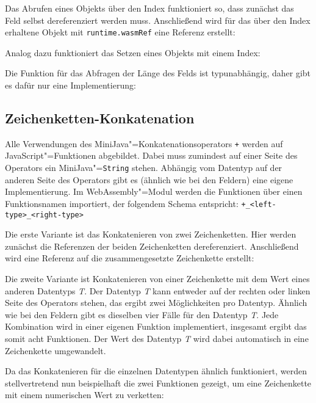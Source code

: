 Das Abrufen eines Objekts über den Index funktioniert so, dass zunächst das Feld selbst dereferenziert werden muss. Anschließend wird für das über den Index erhaltene Objekt mit \lstinline{runtime.wasmRef} eine Referenz erstellt:


Analog dazu funktioniert das Setzen eines Objekts mit einem Index:


Die Funktion für das Abfragen der Länge des Felds ist typunabhängig, daher gibt es dafür nur eine Implementierung:



\subsection{Zeichenketten-Konkatenation}
\label{subsec:JavaScript-Zeichenketten-Konkatenation}

Alle Verwendungen des MiniJava"=Konkatenationsoperators \lstinline{+} werden auf JavaScript"=Funktionen abgebildet. Dabei muss zumindest auf einer Seite des Operators ein MiniJava"=\lstinline{String} stehen. Abhängig vom Datentyp auf der anderen Seite des Operators gibt es (ähnlich wie bei den Feldern) eine eigene Implementierung. Im WebAssembly"=Modul werden die Funktionen über einen Funktionsnamen importiert, der folgendem Schema entspricht: \lstinline{+_<left-type>_<right-type>}

Die erste Variante ist das Konkatenieren von zwei Zeichenketten. Hier werden zunächst die Referenzen der beiden Zeichenketten dereferenziert. Anschließend wird eine Referenz auf die zusammengesetzte Zeichenkette erstellt:


Die zweite Variante ist Konkatenieren von einer Zeichenkette mit dem Wert eines anderen Datentyps \emph{T}. Der Datentyp \emph{T} kann entweder auf der rechten oder linken Seite des Operators stehen, das ergibt zwei Möglichkeiten pro Datentyp. Ähnlich wie bei den Feldern gibt es dieselben vier Fälle für den Datentyp \emph{T}. Jede Kombination wird in einer eigenen Funktion implementiert, insgesamt ergibt das somit acht Funktionen. Der Wert des Datentyp \emph{T} wird dabei automatisch in eine Zeichenkette umgewandelt.

Da das Konkatenieren für die einzelnen Datentypen ähnlich funktioniert, werden stellvertretend nun beispielhaft die zwei Funktionen gezeigt, um eine Zeichenkette mit einem numerischen Wert zu verketten:


